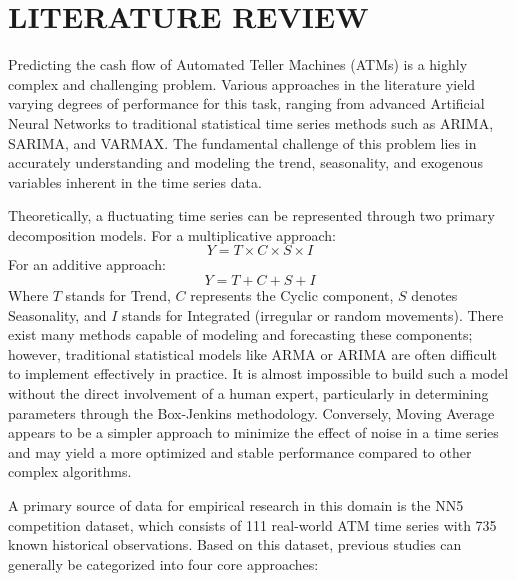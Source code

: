 \documentclass[conference, 12pt, onecolumn]{IEEEtran}
\begin{document}
\section{LITERATURE REVIEW}
Predicting the cash flow of Automated Teller Machines (ATMs) is a highly complex and challenging problem. Various approaches in the literature yield varying degrees of performance for this task, ranging from advanced Artificial Neural Networks to traditional statistical time series methods such as ARIMA, SARIMA, and VARMAX. The fundamental challenge of this problem lies in accurately understanding and modeling the trend, seasonality, and exogenous variables inherent in the time series data.

Theoretically, a fluctuating time series can be represented through two primary decomposition models. For a multiplicative approach:
$$Y = T \times C \times S \times I$$
For an additive approach:
$$Y = T + C + S + I$$
Where $T$ stands for Trend, $C$ represents the Cyclic component, $S$ denotes Seasonality, and $I$ stands for Integrated (irregular or random movements). There exist many methods capable of modeling and forecasting these components; however, traditional statistical models like ARMA or ARIMA are often difficult to implement effectively in practice. It is almost impossible to build such a model without the direct involvement of a human expert, particularly in determining parameters through the Box-Jenkins methodology. Conversely, Moving Average appears to be a simpler approach to minimize the effect of noise in a time series and may yield a more optimized and stable performance compared to other complex algorithms.

A primary source of data for empirical research in this domain is the NN5 competition dataset, which consists of 111 real-world ATM time series with 735 known historical observations. Based on this dataset, previous studies can generally be categorized into four core approaches:
\end{document}
